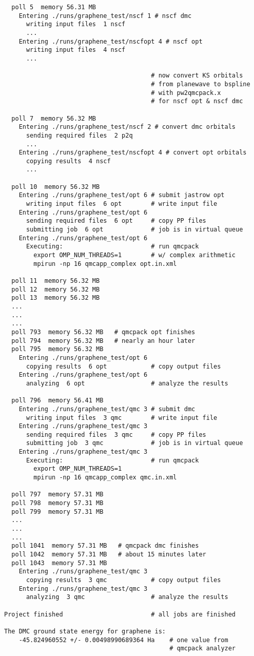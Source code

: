 \documentclass[oneside,11pt]{memoir}
\numberwithin{equation}{section}
\begin{document}
\begin{shaded}
\begin{verbatim}
  poll 5  memory 56.31 MB               
    Entering ./runs/graphene_test/nscf 1 # nscf dmc 
      writing input files  1 nscf 
      ...
    Entering ./runs/graphene_test/nscfopt 4 # nscf opt 
      writing input files  4 nscf 
      ...

                                        # now convert KS orbitals
                                        # from planewave to bspline
                                        # with pw2qmcpack.x
                                        # for nscf opt & nscf dmc

  poll 7  memory 56.32 MB 
    Entering ./runs/graphene_test/nscf 2 # convert dmc orbitals
      sending required files  2 p2q 
      ...
    Entering ./runs/graphene_test/nscfopt 4 # convert opt orbitals
      copying results  4 nscf 
      ...

  poll 10  memory 56.32 MB 
    Entering ./runs/graphene_test/opt 6 # submit jastrow opt
      writing input files  6 opt        # write input file
    Entering ./runs/graphene_test/opt 6 
      sending required files  6 opt     # copy PP files
      submitting job  6 opt             # job is in virtual queue
    Entering ./runs/graphene_test/opt 6 
      Executing:                        # run qmcpack
        export OMP_NUM_THREADS=1        # w/ complex arithmetic
        mpirun -np 16 qmcapp_complex opt.in.xml 

  poll 11  memory 56.32 MB 
  poll 12  memory 56.32 MB 
  poll 13  memory 56.32 MB 
  ...
  ...
  ...
  poll 793  memory 56.32 MB   # qmcpack opt finishes
  poll 794  memory 56.32 MB   # nearly an hour later
  poll 795  memory 56.32 MB 
    Entering ./runs/graphene_test/opt 6 
      copying results  6 opt            # copy output files
    Entering ./runs/graphene_test/opt 6 
      analyzing  6 opt                  # analyze the results

  poll 796  memory 56.41 MB 
    Entering ./runs/graphene_test/qmc 3 # submit dmc
      writing input files  3 qmc        # write input file
    Entering ./runs/graphene_test/qmc 3 
      sending required files  3 qmc     # copy PP files
      submitting job  3 qmc             # job is in virtual queue
    Entering ./runs/graphene_test/qmc 3 
      Executing:                        # run qmcpack
        export OMP_NUM_THREADS=1
        mpirun -np 16 qmcapp_complex qmc.in.xml 

  poll 797  memory 57.31 MB 
  poll 798  memory 57.31 MB 
  poll 799  memory 57.31 MB 
  ...
  ...
  ...
  poll 1041  memory 57.31 MB   # qmcpack dmc finishes
  poll 1042  memory 57.31 MB   # about 15 minutes later
  poll 1043  memory 57.31 MB 
    Entering ./runs/graphene_test/qmc 3 
      copying results  3 qmc            # copy output files
    Entering ./runs/graphene_test/qmc 3 
      analyzing  3 qmc                  # analyze the results

Project finished                        # all jobs are finished
 
The DMC ground state energy for graphene is:
    -45.824960552 +/- 0.00498990689364 Ha    # one value from
                                             # qmcpack analyzer
\end{verbatim}
\end{shaded}
\end{document}
